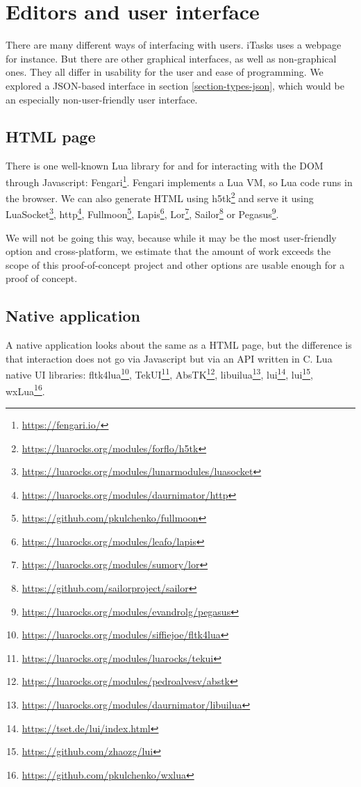 \section{Editors and user interface}\label{section-editors-ui}
There are many different ways of interfacing with users. iTasks uses a webpage for instance. But there are other graphical interfaces, as well as non-graphical ones. They all differ in usability for the user and ease of programming. We explored a JSON-based interface in section \ref{section-types-json}, which would be an especially non-user-friendly user interface.

\subsection{HTML page}
There is one well-known Lua library for and for interacting with the DOM through Javascript: Fengari\footnote{\url{https://fengari.io/}}. Fengari implements a Lua VM, so Lua code runs in the browser. We can also generate HTML using h5tk\footnote{\url{https://luarocks.org/modules/forflo/h5tk}} and serve it using
LuaSocket\footnote{\url{https://luarocks.org/modules/lunarmodules/luasocket}},
http\footnote{\url{https://luarocks.org/modules/daurnimator/http}},
Fullmoon\footnote{\url{https://github.com/pkulchenko/fullmoon}},
Lapis\footnote{\url{https://luarocks.org/modules/leafo/lapis}},
Lor\footnote{\url{https://luarocks.org/modules/sumory/lor}},
Sailor\footnote{\url{https://github.com/sailorproject/sailor}} or
Pegasus\footnote{\url{https://luarocks.org/modules/evandrolg/pegasus}}.

We will not be going this way, because while it may be the most user-friendly option and cross-platform, we estimate that the amount of work exceeds the scope of this proof-of-concept project and other options are usable enough for a proof of concept.

\subsection{Native application}
A native application looks about the same as a HTML page, but the difference is that interaction does not go via Javascript but via an API written in C. Lua native UI libraries:
fltk4lua\footnote{\url{https://luarocks.org/modules/siffiejoe/fltk4lua}},
TekUI\footnote{\url{https://luarocks.org/modules/luarocks/tekui}},
AbsTK\footnote{\url{https://luarocks.org/modules/pedroalvesv/abstk}\label{footnote-abstk}},
libuilua\footnote{\url{https://luarocks.org/modules/daurnimator/libuilua}},
lui\footnote{\url{https://tset.de/lui/index.html}},
lui\footnote{\url{https://github.com/zhaozg/lui}},
wxLua\footnote{\url{https://github.com/pkulchenko/wxlua}}.

